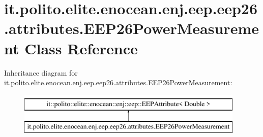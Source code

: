 \hypertarget{classit_1_1polito_1_1elite_1_1enocean_1_1enj_1_1eep_1_1eep26_1_1attributes_1_1_e_e_p26_power_measurement}{}\section{it.\+polito.\+elite.\+enocean.\+enj.\+eep.\+eep26.\+attributes.\+E\+E\+P26\+Power\+Measurement Class Reference}
\label{classit_1_1polito_1_1elite_1_1enocean_1_1enj_1_1eep_1_1eep26_1_1attributes_1_1_e_e_p26_power_measurement}
Inheritance diagram for it.\+polito.\+elite.\+enocean.\+enj.\+eep.\+eep26.\+attributes.\+E\+E\+P26\+Power\+Measurement\+:\begin{figure}[H]
\begin{center}
\leavevmode
\includegraphics[height=2.000000cm]{classit_1_1polito_1_1elite_1_1enocean_1_1enj_1_1eep_1_1eep26_1_1attributes_1_1_e_e_p26_power_measurement}
\end{center}
\end{figure}
